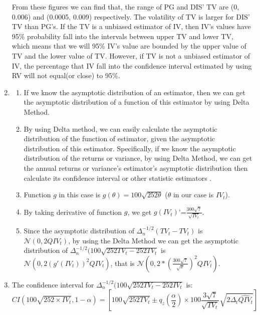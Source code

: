 \documentclass[12pt,letterpaper]{article}
\begin{document}
\begin{enumerate}[label=\textbf{(\Alph*)}]
From these figures we can find that, the range of PG and DIS' TV  are (0, 0.006) and (0.0005, 0.009) respectively. The volatility of TV is larger for DIS' TV than PG's. If the TV is a unbiased estimator of IV, then IV's values have 95\% probability fall into the intervals between upper TV and lower TV, which means that we will 95\% IV's value are bounded by the upper value of TV and the lower value of TV. However, if TV is not a unbiased estimator of IV, the percentage that IV fall into the confidence interval estimated by using RV will not equal(or close) to 95\%.  \\


\item 
 \begin{enumerate}[label=(\roman*)]
    \item If we know the asymptotic distribution of an estimator, then we can get the asymptotic distribution of a function of this estimator by using Delta Method.
    \item By using Delta method, we can easily calculate the asymptotic distribution of the function of estimator, given the asymptotic distribution of this estimator.
    Specifically, if we know the asymptotic distribution of the returns or variance, by using Delta Method, we can get the annual returns or variance's estimator's asymptotic distribution then calculate its confidence interval or other statistic estimators .
    \item Function $g$ in this case is $g(\theta)=100\sqrt{252\theta}$ ($\theta$ in our case is $IV_t$).
    \item By taking derivative of function $g$, we get $g(IV_t)$'=$\frac{300\sqrt{7}}{\sqrt{IV_t}}$.
    \item Since the asymptotic distribution of  $\Delta_n^{-1/2}(TV_t-TV_t)$ is  ~~$\mathcal{N}(0,2QIV_t)$, by using the Delta Method we can get the asymptotic distribution of $\Delta_n^{-1/2}(100\sqrt{252TV_t-252TV_t}$ is ~~$\mathcal{N}(0, 2(g'(IV_t))^2 QIV_t)$, that is  $\mathcal{N}(0, 2*(\frac{300\sqrt{7}}{\sqrt{x}})^2 QIV_t)$.
 \end{enumerate}


\item The confidence interval for $\Delta_n^{-1/2}(100\sqrt{252TV_t-252IV_t}$ is:
$$CI(100\sqrt{252\times IV_t},1-\alpha)=[100 \sqrt{252TV_t} \pm q_z(\frac{\alpha}{2}) \times 100 \frac{3\sqrt{7}}{\sqrt{TV_t}} \sqrt{2\Delta_t \hat{QIV_t}} ]$$


\end{enumerate}
\end{document}
